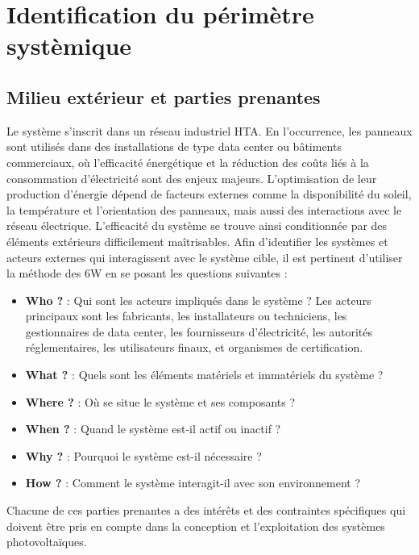 \documentclass{article}
\begin{document}
\section{Identification du périmètre systèmique}


\subsection{Milieu extérieur et parties prenantes}
Le système s'inscrit dans un réseau industriel HTA. En l'occurrence, les panneaux sont utilisés dans des installations de type data center ou bâtiments commerciaux, où l'efficacité énergétique et la réduction des coûts liés à la consommation d'électricité sont des enjeux majeurs. L’optimisation de leur production d’énergie dépend de facteurs externes comme la disponibilité du soleil, la température et l'orientation des panneaux, mais aussi des interactions avec le réseau électrique. L’efficacité du système se trouve ainsi conditionnée par des éléments extérieurs difficilement maîtrisables. 
Afin d'identifier les systèmes et acteurs externes qui interagissent avec le système cible, il est pertinent d'utiliser la méthode des 6W en se posant les questions suivantes :
\begin{itemize}
    \item \textbf{Who ?} : Qui sont les acteurs impliqués dans le système ?
    Les acteurs principaux sont les fabricants, les installateurs ou techniciens, les gestionnaires de data center, les fournisseurs d'électricité, les autorités réglementaires, les utilisateurs finaux, et organismes de certification.
    \item \textbf{What ?} : Quels sont les éléments matériels et immatériels du système ?
    \item \textbf{Where ?} : Où se situe le système et ses composants ?
    \item \textbf{When ?} : Quand le système est-il actif ou inactif ?
    \item \textbf{Why ?} : Pourquoi le système est-il nécessaire ?
    \item \textbf{How ?} : Comment le système interagit-il avec son environnement ?
\end {itemize}



Chacune de ces parties prenantes a des intérêts et des contraintes spécifiques qui doivent être pris en compte dans la conception et l'exploitation des systèmes photovoltaïques.
\end{document}

